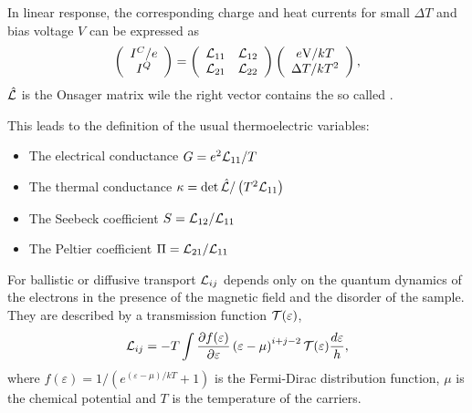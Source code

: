 In linear response, the corresponding charge and heat currents for small  $\Delta T$ and bias voltage $V$
 can be expressed as \cite{benenti2017fundamental}
\begin{equation}
\label{eq:thermoLinearMatrix}
    \left(
        \begin{array}{c}
            I^C/e \\
            I^Q 
        \end{array}
    \right)  
    =  
    \left(
        \begin{array}{cc}
             \mathcal{L}_{ 11 }    &    \mathcal{L}_{ 12 }   \\
             \mathcal{L}_{ 21 }    &    \mathcal{L}_{ 22 }  
        \end{array}
    \right) 
    \left(
        \begin{array}{c}
            e \text{V} / k T\\
            \Delta T / k T^2
        \end{array}
    \right),
\end{equation}
%
$\hat{\cal L}$ is the Onsager matrix \cite{onsager1931reciprocalI, onsager1931reciprocalII} wile the right vector contains the so called . 

This leads to the definition of the usual thermoelectric variables:
\begin{itemize}
  \item The electrical conductance $G=e^2  \mathcal{L}_{ 11 } /T$
  \item The thermal conductance $\kappa= \det{\hat{\cal L}}/\left(T^2  \mathcal{L}_{ 11 }  \right)$
  \item The Seebeck coefficient $S  =  \mathcal{L}_{ 12 } /  \mathcal{L}_{ 11 } $
  \item The Peltier coefficient $\Pi=  \mathcal{L}_{ 21 } /  \mathcal{L}_{ 11 } $
\end{itemize}

For ballistic or diffusive transport  ${\cal L}_{ij}$ depends only on the quantum dynamics of the electrons in the presence of the magnetic field and the disorder of the sample. They are  described by a transmission function $\mathcal{T} (\varepsilon)$,
%
\begin{equation}
  \label{eq:teo:onsaCoef}
   \mathcal{L}_{ ij } = - T \int  \frac{\partial f (\varepsilon)}{\partial \varepsilon} \left(\varepsilon-\mu \right)^{i+j-2} {\cal T}(\varepsilon) \frac{d\varepsilon}{h},
\end{equation}
%
where  $f(\varepsilon)=1/(e^{(\varepsilon-\mu)/k T}+1)$ is the Fermi-Dirac distribution function, $\mu$ is the chemical potential and $T$ is the temperature of the carriers. 

